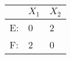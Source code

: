 \begin{tabular}{|l|l|l|}\hline
     &$X_1$ &$X_2$ \\\hline
E:   &0 &2	\\\hline
F:   &2 &0	\\\hline
\end{tabular}
